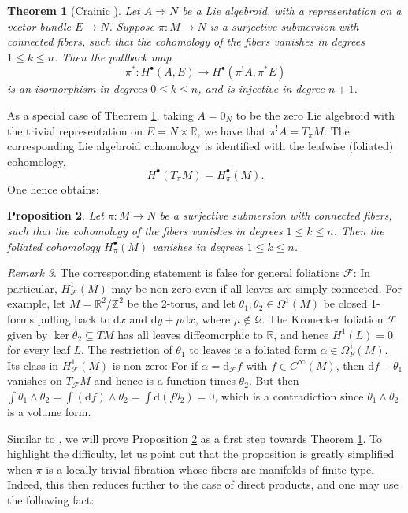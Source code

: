 \documentclass[11pt]{amsart}
\newtheorem{theorem}{Theorem}[section]
\newtheorem{proposition}[theorem]{Proposition}
\theoremstyle{definition}
\theoremstyle{remark}
\newtheorem{remark}[theorem]{Remark}
\newcommand{\Ra}{\Rightarrow}
\newcommand{\ca}{\mathcal}
\newcommand{\F}{\mathcal{F}}
\newcommand{\R}{\mathbb{R}}
\newcommand{\Z}{\mathbb{Z}}
\newcommand{\Q}{\ca{Q}}
\newcommand{\on}{\operatorname}
\renewcommand{\ker}{ \on{ker}}
\renewcommand{\d}{{\mbox{d}}}
\begin{document}
\begin{theorem}[Crainic \cite{cra:dif}]\label{th:main}
Let $A\Ra N$ be a Lie algebroid, with a representation on a vector bundle $E\to N$. Suppose 	
$\pi\colon M\to N$ is a surjective submersion with connected fibers, such that the cohomology of the fibers vanishes in degrees $1\le k\le n$. 
Then the pullback map  
\[ \pi^*\colon H^\bullet(A,E)\to H^\bullet(\pi^!A,\pi^*E)\]
is an isomorphism in degrees $0\le k\le n$, and is injective in degree $n+1$. 	
\end{theorem}
%
As a special case of Theorem \ref{th:main}, taking $A=0_N$ to be the zero Lie algebroid with the trivial representation on $E=N\times \R$, we have that
$\pi^!A=T_\pi M$. The corresponding Lie algebroid cohomology is identified with the leafwise (foliated) cohomology, 
 \[ H^\bullet(T_\pi M)=H^\bullet_\pi(M).\]
One hence obtains: 
%
\begin{proposition}\label{prop:keycorollary}
Let $\pi\colon M\to N$ be a surjective submersion with connected fibers, such that the cohomology of the fibers vanishes in degrees $1\le k\le n$. 
Then the foliated cohomology $H^\bullet_\pi(M)$ vanishes in degrees  $1\le k\le n$.
\end{proposition}
%

\begin{remark}
The corresponding statement is false for general foliations $\F$: In particular, $H^1_\F(M)$ may be non-zero even if all leaves are simply connected. For example, let  $M=\R^2/\Z^2$ be the 2-torus, and let $\theta_1,\theta_2\in \Omega^1(M)$ be closed 1-forms pulling back to 
$\d x$ and $\d y+\mu \d x$, where $\mu\not\in\Q$. 
The Kronecker foliation $\mathcal F$ given by
$\ker\theta_2\subseteq TM$ has all leaves diffeomorphic to
$\mathbb R$, and hence $H^1(L)=0$ for every leaf $L$.  The restriction of $\theta_1$ to leaves is a foliated form $\alpha\in \Omega^1_F(M)$. Its class in  $H^1_\F(M)$ is non-zero: For if $\alpha=\d_\F f$ with $f\in C^\infty(M)$, then $\d f-\theta_1$ vanishes on $T_\F M$ and hence is a  function times $\theta_2$. But then  $\int \theta_1\wedge\theta_2=\int (\d f)\wedge\theta_2=\int \d(f\theta_2)=0$, 
which is a contradiction since $\theta_1\wedge\theta_2$ is a volume form. 
\end{remark}


Similar to \cite{cra:dif}, we will prove Proposition \ref{prop:keycorollary} as a first step towards  Theorem \ref{th:main}. To highlight the difficulty, let us point out that the proposition is greatly simplified when $\pi$ is a locally trivial fibration whose fibers are manifolds of finite type. Indeed, this then 
reduces further to the case of direct products, and one may use the following fact:
\end{document}
